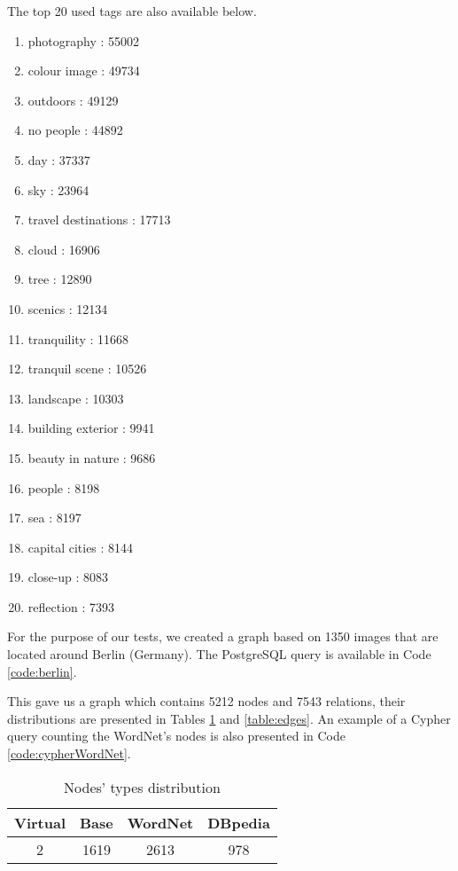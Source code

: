 The top 20 used tags are also available below.
\begin{multicols}{2}
\begin{enumerate}
  \item photography : 55002
  \item colour image : 49734
  \item outdoors : 49129
  \item no people : 44892
  \item day : 37337
  \item sky : 23964
  \item travel destinations : 17713
  \item cloud : 16906
  \item tree : 12890
  \item scenics : 12134
  \item tranquility : 11668
  \item tranquil scene : 10526
  \item landscape : 10303
  \item building exterior : 9941
  \item beauty in nature : 9686
  \item people : 8198
  \item sea : 8197
  \item capital cities : 8144
  \item close-up : 8083
  \item reflection : 7393
\end{enumerate}
\end{multicols}

For the purpose of our tests, we created a graph based on 1350 images that are located around Berlin (Germany). The PostgreSQL query is available in Code \ref{code:berlin}.


This gave us a graph which contains 5212 nodes and 7543 relations, their distributions are presented in Tables \ref{table:nodes} and \ref{table:edges}. An example of a Cypher query counting the WordNet's nodes is also presented in Code \ref{code:cypherWordNet}.\\

\begin{table}[!h]
\centering
\begin{tabular}{|c|c|c|c|}
\hline
{\bf Virtual} & {\bf Base} & {\bf WordNet} & {\bf DBpedia} \\ \hline
2             & 1619       & 2613          & 978           \\ \hline
\end{tabular}
\caption{Nodes' types distribution}
\label{table:nodes}
\end{table}

